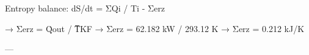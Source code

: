 Entropy balance:  
dS/dt = ΣQi / Ti - Σerz  

→ Σerz = Q̇out / T̅KF  
→ Σerz = 62.182 kW / 293.12 K  
→ Σerz = 0.212 kJ/K  

---